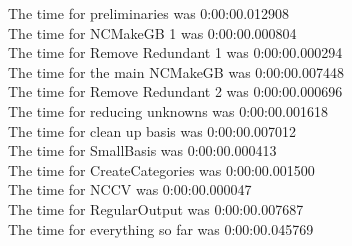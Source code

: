 \documentclass[rep10,leqno]{report}
\begin{document}
\noindent
The time for preliminaries was 0:00:00.012908\\
The time for NCMakeGB 1 was 0:00:00.000804\\
The time for Remove Redundant 1 was 0:00:00.000294\\
The time for the main NCMakeGB was 0:00:00.007448\\
The time for Remove Redundant 2 was 0:00:00.000696\\
The time for reducing unknowns was 0:00:00.001618\\
The time for clean up basis was 0:00:00.007012\\
The time for SmallBasis was 0:00:00.000413\\
The time for CreateCategories was 0:00:00.001500\\
The time for NCCV was 0:00:00.000047\\
The time for RegularOutput was 0:00:00.007687\\
The time for everything so far was 0:00:00.045769\\
\end{document}
